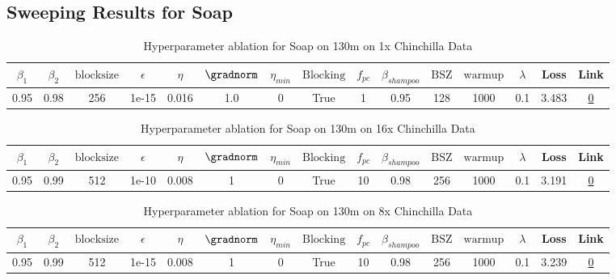 \subsection{Sweeping Results for Soap}%
\begin{table}[H]
\centering
\caption{Hyperparameter ablation for Soap on 130m on 1x Chinchilla Data}
\label{tab:ablation_soap_130m_1}
\begin{tabular}{ccccccccccccccc}
\toprule
$\beta_1$ & $\beta_2$ & $\mathrm{block size}$ & $\epsilon$ & $\eta$ & $\gradnorm$ & $\eta_{min}$ & $\mathrm{Blocking}$ & $f_{pc}$ & $\beta_{shampoo}$ & $\mathrm{BSZ}$ & $\mathrm{warmup}$ & $\lambda$ & Loss & Link \\
\midrule
0.95 & 0.98 & 256 & 1e-15 & 0.016 & 1.0 & 0 & True & 1 & 0.95 & 128 & 1000 & 0.1 & 3.483 & \href{https://wandb.ai/stanford-mercury/optimizer-scaling/runs/sweep-130m-2B-soaplff7de8lr0.016-wd0.1-minlr0-warmup1000-b10.95--f08df8}{0} \\
\midrule
\bottomrule
\end{tabular}
\end{table}

\begin{table}[H]
\centering
\caption{Hyperparameter ablation for Soap on 130m on 16x Chinchilla Data}
\label{tab:ablation_soap_130m_16}
\begin{tabular}{ccccccccccccccc}
\toprule
$\beta_1$ & $\beta_2$ & $\mathrm{block size}$ & $\epsilon$ & $\eta$ & $\gradnorm$ & $\eta_{min}$ & $\mathrm{Blocking}$ & $f_{pc}$ & $\beta_{shampoo}$ & $\mathrm{BSZ}$ & $\mathrm{warmup}$ & $\lambda$ & Loss & Link \\
\midrule
0.95 & 0.99 & 512 & 1e-10 & 0.008 & 1 & 0 & True & 10 & 0.98 & 256 & 1000 & 0.1 & 3.191 & \href{https://wandb.ai/stanford-mercury/optimizer-scaling/runs/sweep-130m-42B-soape1786aelr0.008-wd0.1-minlr0-warmup1000-b10.95-c390d2}{0} \\
\midrule
\bottomrule
\end{tabular}
\end{table}

\begin{table}[H]
\centering
\caption{Hyperparameter ablation for Soap on 130m on 8x Chinchilla Data}
\label{tab:ablation_soap_130m_8}
\begin{tabular}{ccccccccccccccc}
\toprule
$\beta_1$ & $\beta_2$ & $\mathrm{block size}$ & $\epsilon$ & $\eta$ & $\gradnorm$ & $\eta_{min}$ & $\mathrm{Blocking}$ & $f_{pc}$ & $\beta_{shampoo}$ & $\mathrm{BSZ}$ & $\mathrm{warmup}$ & $\lambda$ & Loss & Link \\
\midrule
0.95 & 0.99 & 512 & 1e-15 & 0.008 & 1 & 0 & True & 10 & 0.98 & 256 & 1000 & 0.1 & 3.239 & \href{https://wandb.ai/stanford-mercury/optimizer-scaling/runs/sweep-130m-21B-soape2479ablr0.008-wd0.1-minlr0-warmup1000-b10.95-a17efa}{0} \\
\midrule
\bottomrule
\end{tabular}
\end{table}


